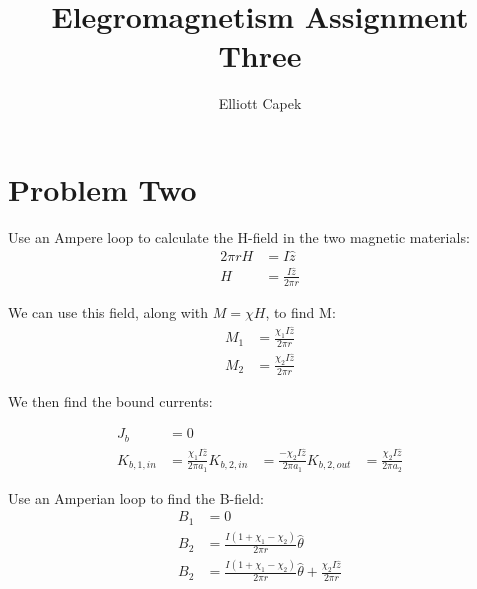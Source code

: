 \documentclass[10pt]{article} %
\title{Elegromagnetism Assignment Three}
\author{Elliott Capek}
\begin{document}
\maketitle{}

\section{Problem Two}
Use an Ampere loop to calculate the H-field in the two magnetic materials:\\

\begin{align*}
  2\pi r H &= I\hat{z}\\
  H &= \frac{I\hat{z}}{2\pi r}
\end{align*}

We can use this field, along with $M=\chi H$, to find M:\\

\begin{align*}
  M_1 &= \frac{\chi_1I\hat{z}}{2\pi r}\\
  M_2 &= \frac{\chi_2I\hat{z}}{2\pi r}
\end{align*}

We then find the bound currents:

\begin{align*}
  J_{b} &= 0\\
  K_{b,1,in} &= \frac{\chi_1I\hat{z}}{2\pi a_1}
  K_{b,2,in} &= \frac{-\chi_2I\hat{z}}{2\pi a_1}
  K_{b,2,out} &= \frac{\chi_2I\hat{z}}{2\pi a_2}
\end{align*}

Use an Amperian loop to find the B-field:\\

\begin{align*}
  B_{1} &= 0\\
  B_{2} &= \frac{I(1+\chi_1-\chi_2)}{2\pi r}\hat{\theta}\\
  B_{2} &= \frac{I(1+\chi_1-\chi_2)}{2\pi r}\hat{\theta} + \frac{\chi_2I\hat{z}}{2\pi r}\\
\end{align*}
\end{document}
